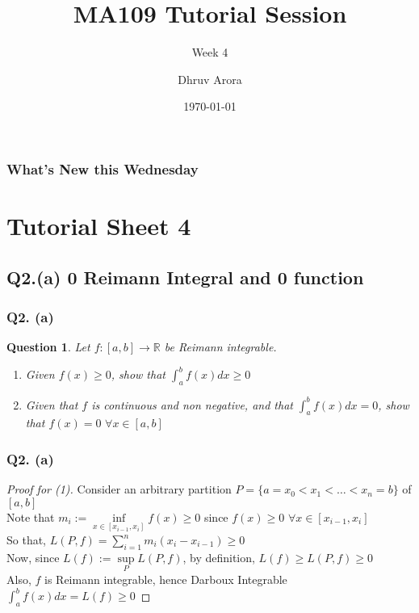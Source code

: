 \documentclass[handout,aspectratio=169]{beamer}
\title{MA109 Tutorial Session}
\subtitle{Week 4}
\author{Dhruv Arora}
\institute{Sophomore, Dept of CSE}
\date{\today}
\newtheorem{qsn}{Question}
\newcommand{\bR}{\mathbb{R}}
\begin{document}
\begin{frame}[plain]
\titlepage
\end{frame}

\begin{frame}[plain]
\frametitle{What's New this Wednesday}
\tableofcontents
\end{frame}

\section{Tutorial Sheet 4}

\subsection{Q2.(a) 0 Reimann Integral and 0 function}

\begin{frame}
\frametitle{Q2. (a)}
\pause
\begin{qsn}
Let $f:[a,b]\to\bR$ be Reimann integrable.\pause
\begin{enumerate}
\item Given $f(x)\geqslant 0$, show that $\int_a^b f(x)dx \geqslant 0$\pause
\item Given that $f$ is continuous and non negative, and that $\int_a^b f(x)dx = 0$, show that $f(x)=0 \,\,\forall x \in [a,b]$
\end{enumerate}
\end{qsn}
\end{frame}

\begin{frame}
\frametitle{Q2. (a)}
\begin{proof}[Proof for (1)]
\pause
Consider an arbitrary partition $P = \{a = x_0<x_1<\dots < x_n = b\}$ of $[a,b]$\\ \pause
Note that $m_i := \inf\limits_{x\in [x_{i-1},x_i]} f(x) \geqslant 0$ since $f(x)\geqslant 0 \,\,\forall x \in [x_{i-1},x_i]$ \\ \pause
So that, $L(P,f) = \sum\limits_{i=1}^n m_i(x_i-x_{i-1}) \geqslant 0$ \\ \pause
Now, since $L(f) := \sup\limits_{P} L(P,f)$, by definition, $L(f)\geqslant L(P,f) \geqslant 0$ \\ \pause
Also, $f$ is Reimann integrable, hence Darboux Integrable \\ \pause
$\int_a^b f(x)dx = L(f) \geqslant 0$
\end{proof}
\end{frame}
\end{document}
